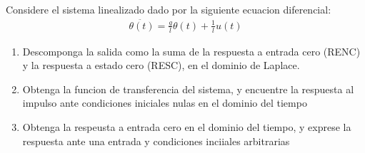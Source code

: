 \documentclass[
  11pt,
  letterpaper,
   addpoints,
   answers
  ]{exam}
\begin{document}
\begin{questions}
    \question Considere el sistema linealizado dado por la siguiente ecuacion diferencial:
    \begin{align}
        \ddot{\theta(t)} =\frac{g}{l}\theta(t) +\frac{1}{l}u(t)
    \end{align}
    \begin{enumerate}
        \item Descomponga la salida como la suma de la respuesta a entrada cero (RENC) y la respuesta a estado cero (RESC), en el dominio de Laplace.
        \item Obtenga la funcion de transferencia del sistema, y encuentre la respuesta al impulso ante condiciones iniciales nulas en el dominio del tiempo
        \item Obtenga la respeusta a entrada cero en el dominio del tiempo, y exprese la respuesta ante una entrada y condiciones inciiales arbitrarias
    \end{enumerate}
    \begin{solution}

\end{solution}
\end{questions}
\end{document}
